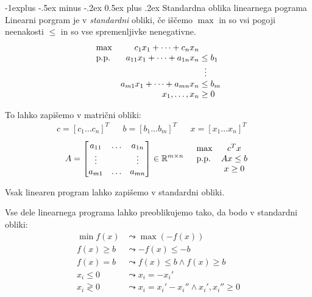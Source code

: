\documentclass[a4paper,8pt]{extarticle}
\makeatletter
\renewcommand{\subsection}{\@startsection{subsection}{2}{0mm}%
                                {-1explus -.5ex minus -.2ex}%
                                {0.5ex plus .2ex}%
                                {\normalfont\normalsize\bfseries}}
\makeatother
\begin{document}
\begin{multicols}{4}
\subsection{Standardna oblika linearnega pograma}
Linearni porgram je v \emph{standardni} obliki, če iščemo $\max$ in so vsi pogoji neenakosti $\leq$ in so vse spremenljivke nenegativne.
\begin{align*}
	\begin{array}{l r@{\;} l} %
		\max 		& c_1 x_1 + \dots + c_n x_n	\\		
		\text{p.p.} & a_{11} x_1 + \dots + a_{1n} x_n &\leq b_1 \\
		& 									& \  \vdots \\										
		& a_{m1} x_1  + \dots + a_{mn} x_n &\leq b_m \\
		& x_1, \dots , x_n & \geq 0
	\end{array}
\end{align*}

To lahko zapišemo v matrični obliki:
\begin{align*}
	c = [c_1 \dots c_n]^T &&
	b = [b_1 \dots b_m]^T &&
	x = [x_1 \dots x_n]^T &&
\end{align*}
\begin{align*}
	A = \begin{bmatrix}
		a_{11} & \dots & a_{1n} \\
		\vdots & 	   & \vdots \\
		a_{m1} & \dots & a_{mn} \\
	\end{bmatrix}
	\in \mathbb{R}^{m \times n}
	&&
	\begin{array}{l@{\hspace{10pt}} c}
		\max & c^Tx \\
		\text{p.p.} & Ax \leq b \\
		& x \geq 0
	\end{array}
\end{align*}

Vsak linearen program lahko zapišemo v standardni obliki.

	Vse dele linearnega programa lahko preoblikujemo tako, da bodo v standardni obliki:
	\begin{align*}
		\min f(x) &\leadsto \max(-f(x)) \\
		f(x) \geq b &\leadsto -f(x) \leq -b \\
		f(x) = b &\leadsto f(x) \leq b \wedge f(x) \geq b \\
		x_i \leq 0 &\leadsto x_i = -x_i' \\
		x_i \gtrless 0 &\leadsto  x_i = x_i' - x_i'' \wedge x_i', x_i'' \geq 0
	\end{align*}


\end{multicols}
\end{document}

